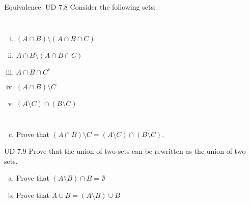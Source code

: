 \begin{frame}{}
  \begin{exampleblock}{Equivalence: UD $7.8$}
    Consider the following sets:
    \begin{columns}
	\begin{enumerate}[(i)]
	  \item $(A \cap B) \setminus (A \cap B \cap C)$
	  \item $A \cap B \setminus (A \cap B \cap C)$
	  \item $A \cap B \cap C^{c}$
	  \item $(A \cap B) \setminus C$
	  \item $(A \setminus C) \cap (B \setminus C)$
	\end{enumerate}
    \end{columns}

    \begin{enumerate}[(a)]
      \setcounter{enumi}{2}
      \item Prove that $(A \cap B) \setminus C = (A \setminus C) \cap (B \setminus C)$.
    \end{enumerate}
  \end{exampleblock}


  \vspace{-0.60cm}
\end{frame}

\begin{frame}{}
  \begin{exampleblock}{UD $7.9$}
    Prove that the union of two sets can be rewritten as the union of two  sets.
    \begin{enumerate}[(a)]
      \item Prove that $(A \setminus B) \cap B = \emptyset$
      \item Prove that $A \cup B = (A \setminus B) \cup B$
    \end{enumerate}
  \end{exampleblock}

  \vspace{0.30cm}
  \begin{columns}
      \pause
  \end{columns}
\end{frame}

